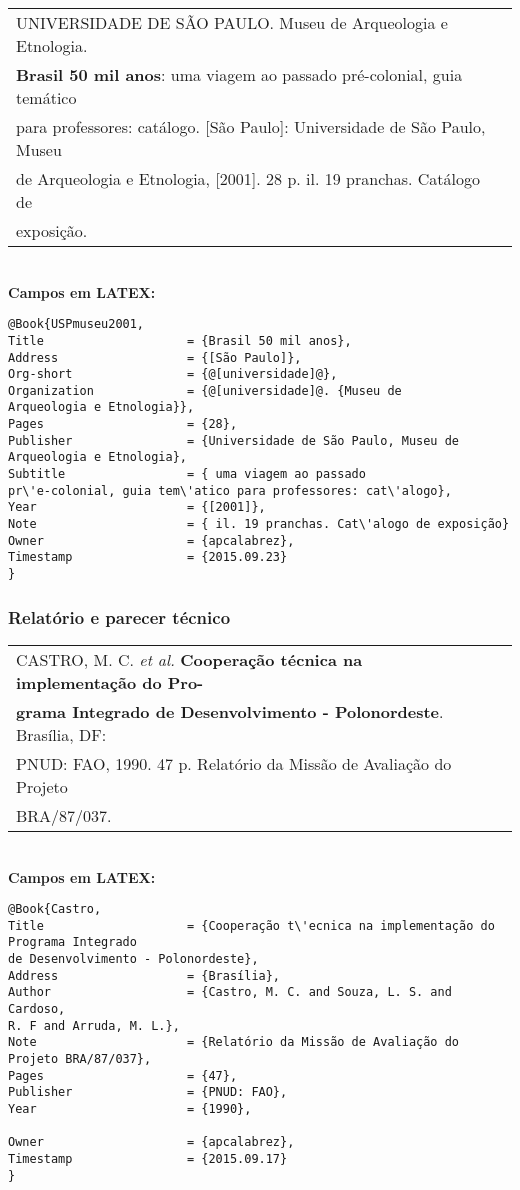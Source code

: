 \begin{tabular}{|l|c|} \hline
	UNIVERSIDADE DE SÃO PAULO. Museu de Arqueologia e Etnologia.  \\ \textbf{Brasil 50 mil anos}: uma viagem ao passado pr\'e-colonial, guia tem\'atico \\ para professores: cat\'alogo. [São Paulo]: Universidade de São Paulo, Museu \\ de
	Arqueologia e Etnologia, [2001]. 28 p. il. 19 pranchas. Cat\'alogo de \\ exposição.   \\\hline
\end{tabular}\\

\textbf{Campos em LATEX:}

\begin{verbatim}
@Book{USPmuseu2001,
Title                    = {Brasil 50 mil anos},
Address                  = {[São Paulo]},
Org-short                = {@[universidade]@},
Organization             = {@[universidade]@. {Museu de 
Arqueologia e Etnologia}},
Pages                    = {28},
Publisher                = {Universidade de São Paulo, Museu de 
Arqueologia e Etnologia},
Subtitle                 = { uma viagem ao passado
pr\'e-colonial, guia tem\'atico para professores: cat\'alogo},
Year                     = {[2001]},
Note                     = { il. 19 pranchas. Cat\'alogo de exposição}
Owner                    = {apcalabrez},
Timestamp                = {2015.09.23}
}
\end{verbatim}

\subsubsection{Relatório e parecer t\'ecnico}

\begin{tabular}{|l|c|} \hline
	CASTRO, M. C. \textit{et al.} \textbf{Cooperação t\'ecnica na implementação do
		Pro-}\\\textbf{grama Integrado de Desenvolvimento - Polonordeste}. Brasília, DF: \\ PNUD: FAO, 1990. 47 p. Relatório da Missão de Avaliação do Projeto \\ BRA/87/037.     \\\hline
\end{tabular}\\

\textbf{Campos em LATEX:}

\begin{verbatim}
@Book{Castro,
Title                    = {Cooperação t\'ecnica na implementação do 
Programa Integrado 
de Desenvolvimento - Polonordeste},
Address                  = {Brasília},
Author                   = {Castro, M. C. and Souza, L. S. and Cardoso, 
R. F and Arruda, M. L.},
Note                     = {Relatório da Missão de Avaliação do 
Projeto BRA/87/037},
Pages                    = {47},
Publisher                = {PNUD: FAO},
Year                     = {1990},

Owner                    = {apcalabrez},
Timestamp                = {2015.09.17}
}
\end{verbatim}

